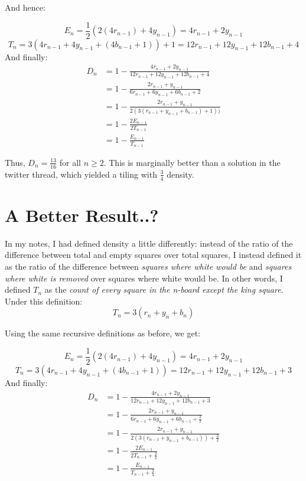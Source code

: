 \documentclass{article}
\begin{document}
   And hence:

$$E_n = \frac{1}{2}(2(4r_{n-1}) + 4y_{n-1}) = 4r_{n-1} + 2y_{n-1}$$
$$T_n = 3(4r_{n-1} + 4y_{n-1} + (4b_{n-1} + 1)) + 1 = 12r_{n-1} + 12y_{n-1} +12b_{n-1} + 4$$
And finally:
\begin{align*}
D_n &= 1 - \frac{4r_{n-1} + 2y_{n-1}}{12r_{n-1} + 12y_{n-1} +12b_{n-1} + 4} \\
 &= 1 - \frac{2r_{n-1} + y_{n-1}}{6r_{n-1} + 6y_{n-1} +6b_{n-1} + 2} \\ 
 &= 1 - \frac{2r_{n-1} + y_{n-1}}{2(3(r_{n-1} + y_{n-1} +b_{n-1}) + 1))} \\ 
 &= 1 - \frac{2E_{n-1}}{2T_{n-1}} \\
 &= 1 - \frac{E_{n-1}}{T_{n-1}} 
\end{align*}   

Thus, $D_n = \frac{13}{16}$ for all $n \geq 2$. This is marginally better than a solution in the twitter thread, which yielded a tiling with $\frac{3}{4}$ density.

    \section*{A Better Result..?}

In my notes, I had defined density a little differently: instead of the ratio of the difference between total and empty squares over total squares, I instead defined it as the ratio of the difference between \textit{squares where white would be} and \textit{squares where white is removed} over squares where white would be. In other words, I defined $T_n$ as the \textit{count of every square in the n-board except the king square}. Under this definition:
$$T_n = 3(r_n + y_n + b_n)$$

Using the same recursive definitions as before, we get:

$$E_n = \frac{1}{2}(2(4r_{n-1}) + 4y_{n-1}) = 4r_{n-1} + 2y_{n-1}$$
$$T_n = 3(4r_{n-1} + 4y_{n-1} + (4b_{n-1} + 1)) = 12r_{n-1} + 12y_{n-1} +12b_{n-1} + 3$$
And finally:
\begin{align*}
D_n &= 1 - \frac{4r_{n-1} + 2y_{n-1}}{12r_{n-1} + 12y_{n-1} +12b_{n-1} + 3} \\
 &= 1 - \frac{2r_{n-1} + y_{n-1}}{6r_{n-1} + 6y_{n-1} +6b_{n-1} + \frac{3}{2}} \\ 
 &= 1 - \frac{2r_{n-1} + y_{n-1}}{2(3(r_{n-1} + y_{n-1} +b_{n-1})) + \frac{3}{2}} \\ 
 &= 1 - \frac{2E_{n-1}}{2T_{n-1} + \frac{3}{2}} \\
 &= 1 - \frac{E_{n-1}}{T_{n-1} + \frac{3}{4}} 
\end{align*}   
\end{document}
